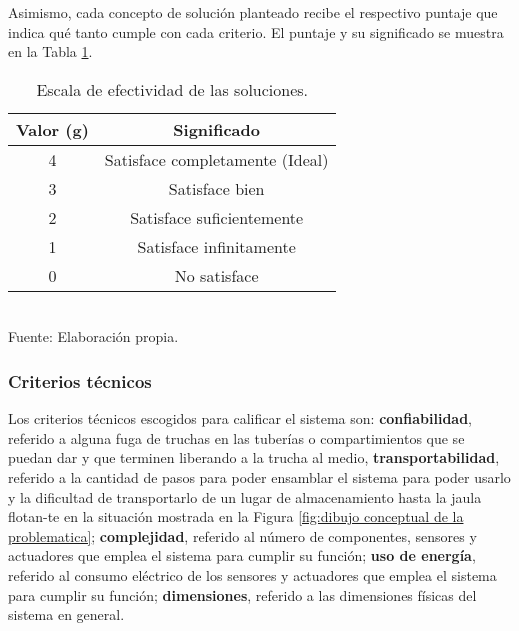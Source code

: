 Asimismo, cada concepto de solución planteado recibe el respectivo puntaje que indica qué tanto cumple con cada criterio. El puntaje y su significado se muestra en la Tabla \ref{tab:escala de efectividad de las soluciones}.

\begin{table}[H]
	\centering
	\caption{Escala de efectividad de las soluciones.}
	\label{tab:escala de efectividad de las soluciones}
	\begin{tabular}{|c|c|}
		\hline
		\rowcolor[HTML]{D9D9D9} 
		\textbf{Valor (g)} & \textbf{Significado} 					\\ \hline
		4                  & Satisface completamente (Ideal)        \\ \hline
		3                  & Satisface bien           				\\ \hline
		2                  & Satisface suficientemente        		\\ \hline
		1                  & Satisface infinitamente     			\\ \hline
		0                  & No satisface				     		\\ \hline
	\end{tabular}
	\\Fuente: Elaboración propia.
\end{table}


\subsubsection{Criterios técnicos}

Los criterios técnicos escogidos para calificar el sistema son: \textbf{confiabilidad}, referido a alguna fuga de truchas en las tuberías o compartimientos que se puedan dar y que terminen liberando a la trucha al medio, \textbf{transportabilidad}, referido a la cantidad de pasos para poder ensamblar el sistema para poder usarlo y la dificultad de transportarlo de un lugar de almacenamiento hasta la jaula flotan-te en la situación mostrada en la Figura \ref{fig:dibujo conceptual de la problematica}; \textbf{complejidad}, referido al número de componentes, sensores y actuadores que emplea el sistema para cumplir su función; \textbf{uso de energía}, referido al consumo eléctrico de los sensores y actuadores que emplea el sistema para cumplir su función; \textbf{dimensiones}, referido a las dimensiones físicas del sistema en general.

